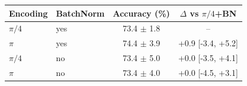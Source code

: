 \begin{tabular}{llcc}
\toprule
Encoding & BatchNorm & Accuracy (\%) & $\Delta$ vs $\pi/4$+BN \\
\midrule
$\pi/4$ & yes & 73.4 $\pm$ 1.8 & -- \\
$\pi$ & yes & 74.4 $\pm$ 3.9 & +0.9 [-3.4, +5.2] \\
$\pi/4$ & no & 73.4 $\pm$ 5.0 & +0.0 [-3.5, +4.1] \\
$\pi$ & no & 73.4 $\pm$ 4.0 & +0.0 [-4.5, +3.1] \\
\bottomrule
\end{tabular}
